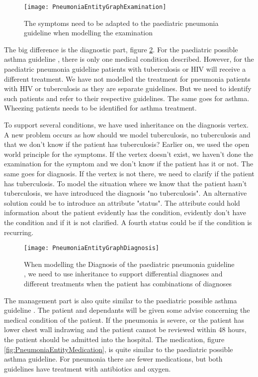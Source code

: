 \begin{figure}[h!]
	\texttt{[image: PneumoniaEntityGraphExamination]}
	\caption {The symptoms need to be adapted to the paediatric pneumonia guideline \parencite{RepublicofKeny2016} when modelling the examination}
	\label{fig:PneumoniaEntityGraphExamination}
\end{figure}

The big difference is the diagnostic part, figure \ref{fig:PneumoniaEntityGraphDiagnosis}. For the paediatric possible asthma guideline \parencite{RepublicofKeny2016}, there is only one medical condition described. However, for the paediatric pneumonia guideline \parencite{RepublicofKeny2016} patients with tuberculosis or HIV will receive a different treatment. We have not modelled the treatment for pneumonia patients with HIV or tuberculosis as they are separate guidelines. But we need to identify such patients and refer to their respective guidelines. The same goes for asthma. Wheezing patients needs to be identified for asthma treatment.

To support several conditions, we have used inheritance on the diagnosis vertex. A new problem occurs as how should we model tuberculosis, no tuberculosis and that we don't know if the patient has tuberculosis? Earlier on, we used the open world principle for the symptoms. If the vertex doesn't exist, we haven't done the examination for the symptom and we don't know if the patient has it or not. The same goes for diagnosis. If the vertex is not there, we need to clarify if the patient has tuberculosis. To model the situation where we know that the patient hasn't tuberculosis, we have introduced the diagnosis "no tuberculosis". An alternative solution could be to introduce an attribute "status". The attribute could hold information about the patient evidently has the condition, evidently don't have the condition and if it is not clarified. A fourth status could be if the condition is recurring.


\begin{figure}[h!]
	\texttt{[image: PneumoniaEntityGraphDiagnosis]}
	\caption {When modelling the Diagnosis of the paediatric pneumonia guideline \parencite{RepublicofKeny2016}, we need to use inheritance to support differential diagnoses and different treatments when the patient has combinations of diagnoses}
	\label{fig:PneumoniaEntityGraphDiagnosis}
\end{figure}


The management part is also quite similar to the paediatric possible asthma guideline \parencite{RepublicofKeny2016}. The patient and dependants will be given some advise concerning the medical condition of the patient. If the pneumonia is severe, or the patient has lower chest wall indrawing and the patient cannot be reviewed within 48 hours, the patient should be admitted into the hospital. The medication, figure \ref{fig:PneumoniaEntityMedication}, is quite similar to the paediatric possible asthma guideline. For pneumonia there are fewer medications, but both guidelines have treatment with antibiotics and oxygen.


